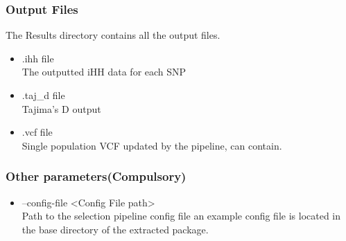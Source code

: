 \documentclass[a4paper,10pt]{article}
\begin{document}
\subsubsection{Output Files}
The Results directory contains all the output files.
\begin{itemize}
\item .ihh file\\
The outputted iHH data for each SNP
\item .taj\_d file\\
Tajima's D output
\item .vcf file\\
Single population VCF updated by the pipeline, can contain.
\end{itemize}
\subsubsection{Other parameters(Compulsory)}
\begin{itemize}
\item --config-file <Config File path>\\
Path to the selection pipeline config file an example config file is located in the base directory of the extracted package.
\end{itemize}
\end{document}
